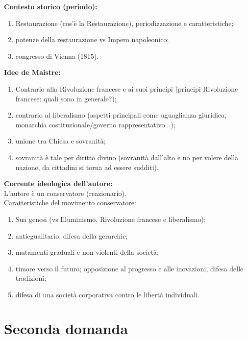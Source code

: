 \documentclass[a4paper]{article}
\begin{document}
\textbf{Contesto storico (periodo):}
\begin{enumerate}
    \item Restaurazione (cos'è la Restaurazione), periodizzazione e caratteristiche;
    \item potenze della restaurazione vs Impero napoleonico;
    \item congresso di Vienna (1815).
\end{enumerate}

\textbf{Idee de Maistre:}
\begin{enumerate}
    \item Contrario alla Rivoluzione francese e ai suoi principi (principi Rivoluzione francese: quali sono in generale?);
    \item contrario al liberalismo (aspetti principali come uguaglianza giuridica, monarchia costituzionale/governo rappresentativo...);
    \item unione tra Chiesa e sovranità;
    \item sovranità è tale per diritto divino (sovranità dall'alto e no per volere della nazione, da cittadini si torna ad essere sudditi).
\end{enumerate}

\textbf{Corrente ideologica dell'autore:} \\
L'autore è un conservatore (reazionario). \\
Caratteristiche del movimento conservatore:
\begin{enumerate}
    \item Sua genesi (vs Illuminismo, Rivoluzione francese e liberalismo);
    \item antiegualitario, difesa della gerarchie;
    \item mutamenti graduali e non violenti della società;
    \item timore verso il futuro; opposizione al progresso e alle inovazioni, difesa delle tradizioni;
    \item difesa di una società corporativa contro le libertà individuali.
\end{enumerate}

\section{Seconda domanda}
\end{document}
